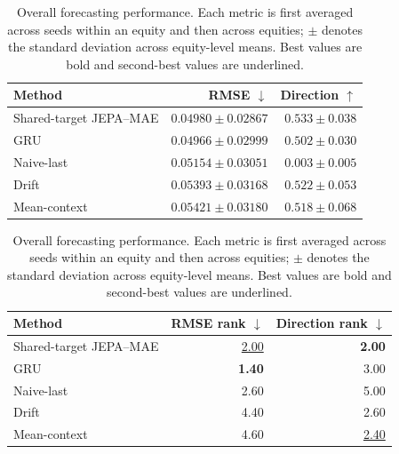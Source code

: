 \begin{table}[t]
\centering
\small
\caption{Overall forecasting performance. Each metric is first averaged across seeds within an equity and then across equities; $\pm$ denotes the standard deviation across equity-level means. Best values are bold and second-best values are underlined.}
\label{tab:main_metrics}
\begin{tabular}{lrr}
\toprule
Method & RMSE $\downarrow$ & Direction $\uparrow$ \\
\midrule
Shared-target JEPA--MAE & \underline{$0.04980 \pm 0.02867$} & \textbf{$0.533 \pm 0.038$} \\
GRU & \textbf{$0.04966 \pm 0.02999$} & $0.502 \pm 0.030$ \\
Naive-last & $0.05154 \pm 0.03051$ & $0.003 \pm 0.005$ \\
Drift & $0.05393 \pm 0.03168$ & \underline{$0.522 \pm 0.053$} \\
Mean-context & $0.05421 \pm 0.03180$ & $0.518 \pm 0.068$ \\
\bottomrule
\end{tabular}
\par\medskip
\begin{tabular}{lrr}
\toprule
Method & RMSE rank $\downarrow$ & Direction rank $\downarrow$ \\
\midrule
Shared-target JEPA--MAE & \underline{2.00} & \textbf{2.00} \\
GRU & \textbf{1.40} & 3.00 \\
Naive-last & 2.60 & 5.00 \\
Drift & 4.40 & 2.60 \\
Mean-context & 4.60 & \underline{2.40} \\
\bottomrule
\end{tabular}
\end{table}
